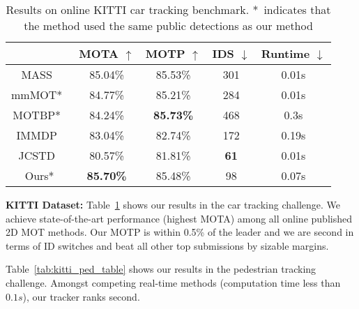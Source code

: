 \documentclass[letterpaper, 10 pt, conference]{ieeeconf}
\begin{document}
\begin{table}[t]
\vspace{0.15cm}
\footnotesize
    \centering
\begin{tabular}{ | c | c | c | c | c |}
\hline
 & MOTA $\uparrow$ & MOTP $\uparrow$ & IDS $\downarrow$ & Runtime $\downarrow$\\ 
   \hline\hline
 MASS~\cite{8782450} & 85.04\% & 85.53\% & 301 & 0.01s\\
 \hline
 mmMOT*~\cite{luiten2020track} & 84.77\% & 85.21\% & 284 & 0.01s \\ \hline
MOTBP*~\cite{8461018} & 84.24\% & \bf 85.73\% & 468 & 0.3s \\ \hline
 IMMDP~\cite{Xiang_2015_ICCV} & 83.04\% & 82.74\% & 172 & 0.19s \\ \hline
JCSTD~\cite{8621602} & 80.57\% & 81.81\% & \bf 61 & 0.01s \\
 \hline\hline
 Ours* & \bf 85.70\% & 85.48\% & 98 & 0.07s \\
\hline
\end{tabular}
    \caption{Results on online KITTI car tracking benchmark. *~indicates that the method used the same public detections as our method}
    \label{tab:kitti_car_table}
    \vspace{-5pt}
\end{table}



\textbf{KITTI Dataset:} Table~\ref{tab:kitti_car_table} shows our results in the car tracking challenge. We achieve state-of-the-art performance (highest MOTA) among all online published 2D MOT methods. 
Our MOTP is within 0.5\% of the leader and we are second in terms of ID switches and beat all other top submissions by sizable margins.

Table~\ref{tab:kitti_ped_table} shows our results in the pedestrian tracking challenge. Amongst competing real-time methods (computation time less than $0.1s$), our tracker ranks second.
\end{document}

